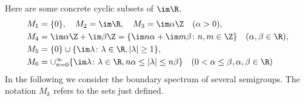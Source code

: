 	Here are some concrete cyclic subsets of\/ $\im \R$.
	\begin{align*}
		M_{1} &= \{0\}, \quad M_{2} = \im\R, \quad M_{3} = \im\alpha\Z \quad (\alpha > 0), \\
		M_{4} &= \im\alpha\Z + \im\beta\Z = \{\im n\alpha +  \im m\beta \colon n,m \in \Z\} \quad (\alpha, \beta \in \R), \\
		M_{5} &= \{0\} \cup \{\im \lambda \colon \lambda \in \R, |\lambda| \geq 1\}, \\
		M_{6} &= \cup_{n=0}^{\infty}\{\im \lambda \colon \lambda \in \R, n\alpha \leq |\lambda| \leq n\beta\} \quad (0 < \alpha \leq \beta, \alpha,\beta \in \R)
	\end{align*}
	In the following we consider the boundary spectrum of several semigroups. 
    The notation $M_{k}$ refers to the sets just defined.
